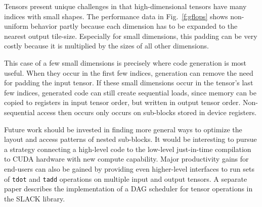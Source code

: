 \documentclass[preprint]{sigplanconf}
\begin{document}
  Tensors present unique challenges in that high-dimensional tensors
have many indices with small shapes.  The performance data in Fig.~\ref{f:gflops}
shows non-uniform behavior partly because each dimension has to be expanded
to the nearest output tile-size.  Especially for small dimensions,
this padding can be very costly because it is multiplied by the
sizes of all other dimensions.

  This case of a few small dimensions is precisely where code generation
is most useful.  When they occur in the first few indices, generation can remove
the need for padding the input tensor.  If these small dimensions occur in the tensor's
last few indices, generated code can still create sequential loads, since memory
can be copied to registers in input tensor order, but written in output tensor order.
Non-sequential access then occurs only occurs on sub-blocks stored in device registers.

  Future work should be invested in finding more general ways to optimize the layout and access patterns
of nested sub-blocks.  It would be interesting to pursue a strategy connecting
a high-level code to the low-level just-in-time compilation to CUDA hardware with
new compute capability.  Major productivity gains for end-users can also be gained by providing
even higher-level interfaces to run sets of {\tt tdot} and {\tt tadd} operations on multiple input and
output tensors.  A separate paper describes the implementation of a DAG scheduler
for tensor operations in the SLACK library.



\end{document}
